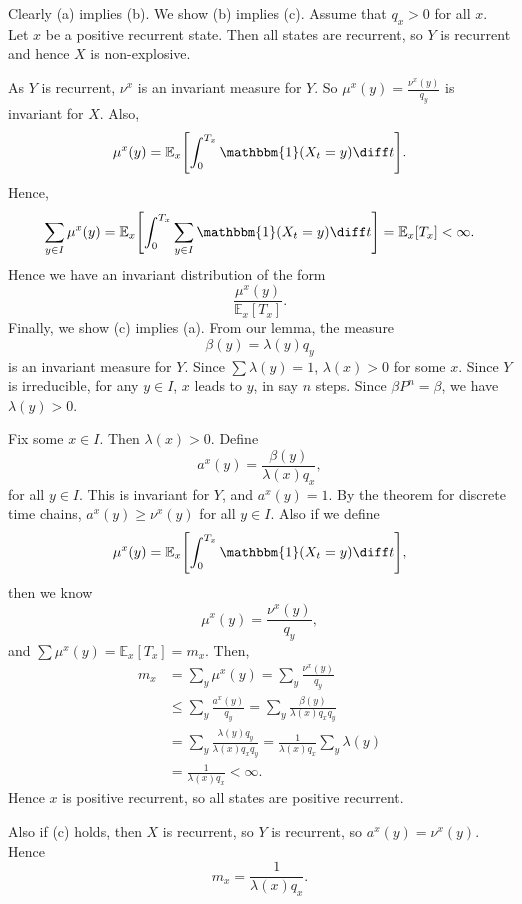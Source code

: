 \documentclass[12pt]{article}
\begin{document}
\begin{proofbox}
	Clearly (a) implies (b). We show (b) implies (c). Assume that $q_x > 0$ for all $x$. Let $x$ be a positive recurrent state. Then all states are recurrent, so $Y$ is recurrent and hence $X$ is non-explosive.

	As $Y$ is recurrent, $\nu^{x}$ is an invariant measure for $Y$. So $\mu^{x}(y) = \frac{\nu^{x}(y)}{q_y}$ is invariant for $X$. Also,
	\[
		\mu^{x}(y) = \mathbb{E}_x \Biggl[ \int_{0}^{T_x} \mathbbm{1}(X_t = y) \diff t \Biggr]
	.\]
	Hence,
	\[
		\sum_{y \in I} \mu^{x}(y) = \mathbb{E}_x \Biggl[ \int_{0}^{T_x} \sum_{y \in I} \mathbbm{1}(X_t = y) \diff t \Biggr] = \mathbb{E}_x[T_x] < \infty
	.\]
	Hence we have an invariant distribution of the form
	\[
	\frac{\mu^{x}(y)}{\mathbb{E}_x[T_x]}
	.\]
	Finally, we show (c) implies (a). From our lemma, the measure
	\[
	\beta(y) = \lambda(y) q_y
	\]
	is an invariant measure for $Y$. Since $\sum \lambda(y) = 1$, $\lambda(x) > 0$ for some $x$. Since $Y$ is irreducible, for any $y \in I$, $x$ leads to $y$, in say $n$ steps. Since $\beta P^{n} = \beta$, we have $\lambda(y) > 0$.

	Fix some $x \in I$. Then $\lambda(x) > 0$. Define
	\[
	a^{x}(y) = \frac{\beta(y)}{\lambda(x) q_x}
	,\]
	for all $y \in I$. This is invariant for $Y$, and $a^{x}(y) = 1$. By the theorem for discrete time chains, $a^{x}(y) \geq \nu^{x}(y)$ for all $y \in I$. Also if we define
	\[
		\mu^{x}(y) = \mathbb{E}_x \Biggl[ \int_{0}^{T_x} \mathbbm{1}(X_t = y) \diff t \Biggr]
	,\]
	then we know
	\[
	\mu^{x}(y) = \frac{\nu^{x}(y)}{q_y}
	,\]
	and $\sum \mu^{x}(y) = \mathbb{E}_x[T_x] = m_x$. Then,
	\begin{align*}
		m_x &= \sum_y \mu^{x}(y) = \sum_y \frac{\nu^{x}(y)}{q_y} \\
		    &\leq \sum_y \frac{a^{x}(y)}{q_y} = \sum_y \frac{\beta(y)}{\lambda(x) q_x q_y} \\
		    &= \sum_y \frac{\lambda(y) q_y}{\lambda(x) q_x q_y} = \frac{1}{\lambda(x) q_x} \sum_y \lambda(y) \\
		    &= \frac{1}{\lambda(x) q_x} < \infty.
	\end{align*}
	Hence $x$ is positive recurrent, so all states are positive recurrent.

	Also if (c) holds, then $X$ is recurrent, so $Y$ is recurrent, so $a^{x}(y) = \nu^{x}(y)$. Hence
	\[
	m_x = \frac{1}{\lambda(x) q_x}
	.\]
\end{proofbox}
\end{document}
